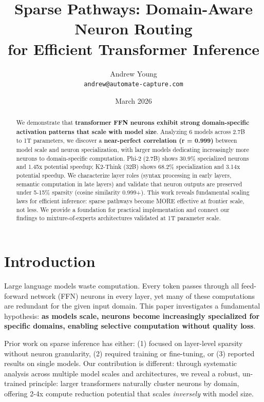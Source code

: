 \documentclass{article}
\title{Sparse Pathways: Domain-Aware Neuron Routing\\for Efficient Transformer Inference}
\author{
  Andrew Young\\
  \texttt{andrew@automate-capture.com}
}
\date{March 2026}
\begin{document}
\maketitle

\begin{abstract}
We demonstrate that \textbf{transformer FFN neurons exhibit strong domain-specific activation patterns that scale with model size}. Analyzing 6 models across 2.7B to 1T parameters, we discover a \textbf{near-perfect correlation (r = 0.999)} between model scale and neuron specialization, with larger models dedicating increasingly more neurons to domain-specific computation. Phi-2 (2.7B) shows 30.9\% specialized neurons and 1.45x potential speedup; K2-Think (32B) shows 68.2\% specialization and 3.14x potential speedup. We characterize layer roles (syntax processing in early layers, semantic computation in late layers) and validate that neuron outputs are preserved under 5-15\% sparsity (cosine similarity 0.999+). This work reveals fundamental scaling laws for efficient inference: sparse pathways become MORE effective at frontier scale, not less. We provide a foundation for practical implementation and connect our findings to mixture-of-experts architectures validated at 1T parameter scale.
\end{abstract}

\section{Introduction}

Large language models waste computation. Every token passes through all feed-forward network (FFN) neurons in every layer, yet many of these computations are redundant for the given input domain. This paper investigates a fundamental hypothesis: \textbf{as models scale, neurons become increasingly specialized for specific domains, enabling selective computation without quality loss}.

Prior work on sparse inference has either: (1) focused on layer-level sparsity without neuron granularity, (2) required training or fine-tuning, or (3) reported results on single models. Our contribution is different: through systematic analysis across multiple model scales and architectures, we reveal a robust, un-trained principle: larger transformers naturally cluster neurons by domain, offering 2-4x compute reduction potential that scales \textit{inversely} with model size.
\end{document}
